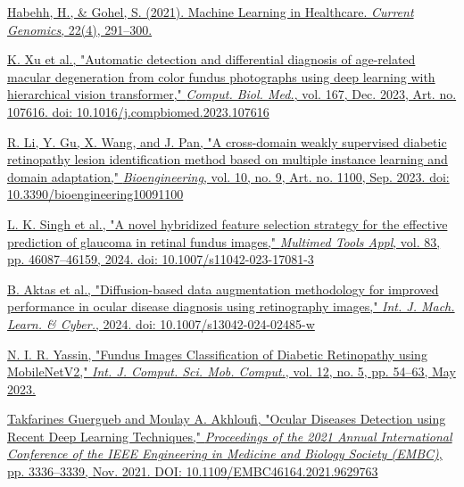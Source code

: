 \documentclass{ijclclp}
\begin{document}



\begin{itemize}
\href{https://doi.org/10.2174/1389202922666210705124359}{
Habehh, H., \& Gohel, S. (2021). Machine Learning in Healthcare. \textit{Current Genomics}, 22(4), 291–300.}

\href{https://doi.org/10.1016/j.compbiomed.2023.107616}{
K. Xu et al., "Automatic detection and differential diagnosis of age-related macular degeneration from color fundus photographs using deep learning with hierarchical vision transformer," \textit{Comput. Biol. Med.}, vol. 167, Dec. 2023, Art. no. 107616. doi: 10.1016/j.compbiomed.2023.107616}

\href{https://doi.org/10.3390/bioengineering10091100}{
R. Li, Y. Gu, X. Wang, and J. Pan, "A cross-domain weakly supervised diabetic retinopathy lesion identification method based on multiple instance learning and domain adaptation," \textit{Bioengineering}, vol. 10, no. 9, Art. no. 1100, Sep. 2023. doi: 10.3390/bioengineering10091100}

\href{https://doi.org/10.1007/s11042-023-17081-3}{
L. K. Singh et al., "A novel hybridized feature selection strategy for the effective prediction of glaucoma in retinal fundus images," \textit{Multimed Tools Appl}, vol. 83, pp. 46087–46159, 2024. doi: 10.1007/s11042-023-17081-3}

\href{https://doi.org/10.1007/s13042-024-02485-w}{
B. Aktas et al., "Diffusion-based data augmentation methodology for improved performance in ocular disease diagnosis using retinography images," \textit{Int. J. Mach. Learn. \& Cyber.}, 2024. doi: 10.1007/s13042-024-02485-w}

\href{https://doi.org/10.47760/ijcsmc.2023.v12i05.006}
{N. I. R. Yassin, "Fundus Images Classification of Diabetic Retinopathy using MobileNetV2," \textit{Int. J. Comput. Sci. Mob. Comput.}, vol. 12, no. 5, pp. 54–63, May 2023.}

\href{https://doi.org/10.1109/EMBC46164.2021.9629763}{%
Takfarines Guergueb and Moulay A. Akhloufi, 
"Ocular Diseases Detection using Recent Deep Learning Techniques," 
\textit{Proceedings of the 2021 Annual International Conference of the IEEE Engineering in Medicine and Biology Society (EMBC)}, 
pp. 3336--3339, Nov. 2021. DOI: 10.1109/EMBC46164.2021.9629763}



\end{itemize}
\end{document}

